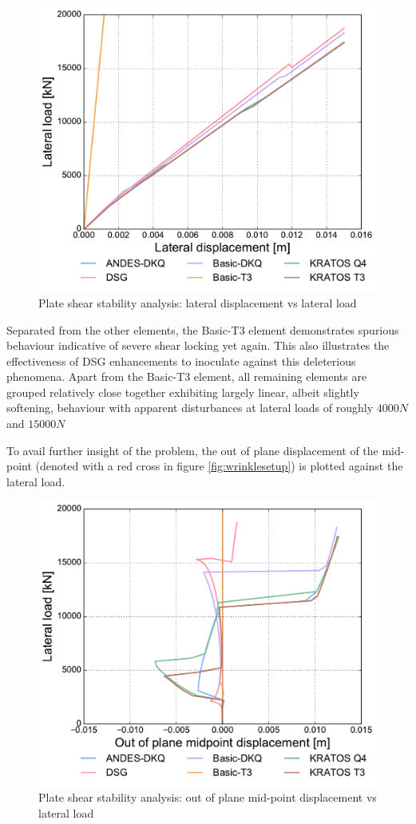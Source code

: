 \begin{figure}[H]
	\centering
	\def\svgwidth{\columnwidth}
	\includegraphics[width=12cm]{images/stability_wrinkle_axial_disp.pdf}
	\caption{Plate shear stability analysis: lateral displacement vs lateral load}
	\label{pic:wrinkle1}
\end{figure}

Separated from the other elements, the Basic-T3 element demonstrates spurious behaviour indicative of severe shear locking yet again. This also illustrates the effectiveness of DSG enhancements to inoculate against this deleterious phenomena. Apart from the Basic-T3 element, all remaining elements are grouped relatively close together exhibiting largely linear, albeit slightly softening, behaviour with apparent disturbances at lateral loads of roughly $4000N$ and $15000N$

To avail further insight of the problem, the out of plane displacement of the mid-point (denoted with a red cross in figure \ref{fig:wrinklesetup}) is plotted against the lateral load.

\begin{figure}[H]
	\centering
	\def\svgwidth{\columnwidth}
	\includegraphics[width=12cm]{images/stability_wrinkle_pointtrans_disp.pdf}
	\caption{Plate shear stability analysis: out of plane mid-point displacement vs lateral load}
	\label{pic:wrinkle2}
\end{figure}


